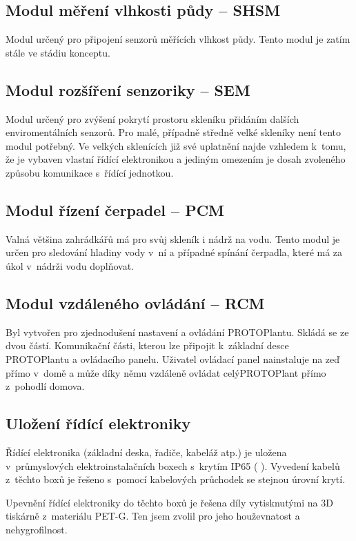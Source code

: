 \subsection{Modul měření vlhkosti půdy -- SHSM}
\label{subsec:SHSM}
Modul určený pro připojení senzorů měřících vlhkost půdy.
Tento modul je zatím stále ve stádiu konceptu.

\subsection{Modul rozšíření senzoriky -- SEM}
\label{subsec:SEM}
Modul určený pro zvýšení pokrytí prostoru skleníku přidáním dalších enviromentálních senzorů.
Pro malé, případně středně velké skleníky není tento modul potřebný. 
Ve velkých sklenících již své uplatnění najde vzhledem k~tomu, že je vybaven vlastní řídící elektronikou a jediným omezením je dosah zvoleného způsobu komunikace s~řídící jednotkou.

\subsection{Modul řízení čerpadel -- PCM}
\label{subsec:PCM}
Valná většina zahrádkářů má pro svůj skleník i nádrž na vodu.
Tento modul je určen pro sledování hladiny vody v~ní a případné spínání čerpadla, které má za úkol v~nádrži vodu doplňovat.

\subsection{Modul vzdáleného ovládání -- RCM}
\label{subsec:RCM}
Byl vytvořen pro zjednodušení nastavení a ovládání PROTOPlantu.
Skládá se ze dvou částí. 
Komunikační části, kterou lze připojit k~základní desce PROTOPlantu a ovládacího panelu. 
Uživatel ovládací panel nainstaluje na zeď přímo v~domě a může díky němu vzdáleně ovládat celýPROTOPlant přímo z~pohodlí domova. 

\subsection{Uložení řídící elektroniky}
Řídící elektronika (základní deska, řadiče, kabeláž atp.) je uložena v~průmyslových elektroinstalačních boxech s~krytím IP65 ( \cite{IP_ratings}).
Vyvedení kabelů z~těchto boxů je řešeno s~pomocí kabelových průchodek se stejnou úrovní krytí.

Upevnění řídící elektroniky do těchto boxů je řešena díly vytisknutými na 3D tiskárně z~materiálu PET-G.
Ten jsem zvolil pro jeho houževnatost a nehygrofilnost.

